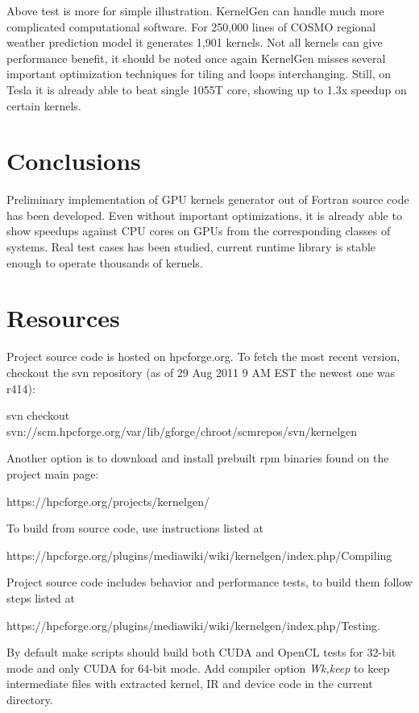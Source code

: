 \documentclass[a4,12pt]{article}
\begin{document}
Above test is more for simple illustration. KernelGen can handle much more complicated computational software. For 250,000 lines of COSMO regional weather prediction model it generates 1,901 kernels. Not all kernels can give performance benefit, it should be noted once again KernelGen misses several important optimization techniques for tiling and loops interchanging. Still, on Tesla it is already able to beat single 1055T core, showing up to 1.3x speedup on certain kernels.

\section{Conclusions}

Preliminary implementation of GPU kernels generator out of Fortran source code has been developed. Even without important optimizations, it is already able to show speedups against CPU cores on GPUs from the corresponding classes of systems. Real test cases has been studied, current runtime library is stable enough to operate thousands of kernels.

\section{Resources}

Project source code is hosted on hpcforge.org. To fetch the most recent version, checkout the svn repository (as of 29 Aug 2011 9 AM EST the newest one was r414):

\begin{code}
svn checkout
  svn://scm.hpcforge.org/var/lib/gforge/chroot/scmrepos/svn/kernelgen
\end{code}

Another option is to download and install prebuilt rpm binaries found on the project main page:
\begin{code}
https://hpcforge.org/projects/kernelgen/
\end{code}

To build from source code, use instructions listed at 
\begin{code}
https://hpcforge.org/plugins/mediawiki/wiki/kernelgen/index.php/Compiling
\end{code}

Project source code includes behavior and performance tests, to build them follow steps listed at 
\begin{code}
https://hpcforge.org/plugins/mediawiki/wiki/kernelgen/index.php/Testing.
\end{code}
By default make scripts should build both CUDA and OpenCL tests for 32-bit mode and only CUDA for 64-bit mode. Add compiler option \emph{\-Wk,\-\-keep} to keep intermediate files with extracted kernel, IR and device code in the current directory.
\end{document}
